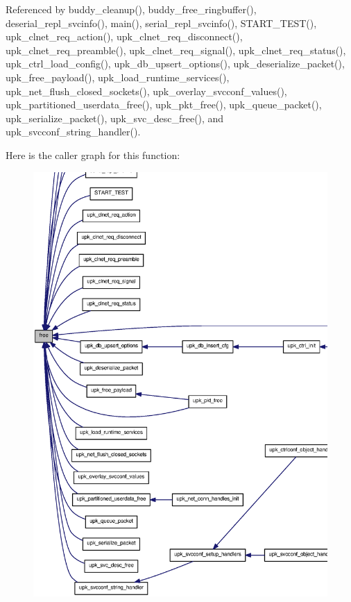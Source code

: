 Referenced by buddy\_\-cleanup(), buddy\_\-free\_\-ringbuffer(), deserial\_\-repl\_\-svcinfo(), main(), serial\_\-repl\_\-svcinfo(), START\_\-TEST(), upk\_\-clnet\_\-req\_\-action(), upk\_\-clnet\_\-req\_\-disconnect(), upk\_\-clnet\_\-req\_\-preamble(), upk\_\-clnet\_\-req\_\-signal(), upk\_\-clnet\_\-req\_\-status(), upk\_\-ctrl\_\-load\_\-config(), upk\_\-db\_\-upsert\_\-options(), upk\_\-deserialize\_\-packet(), upk\_\-free\_\-payload(), upk\_\-load\_\-runtime\_\-services(), upk\_\-net\_\-flush\_\-closed\_\-sockets(), upk\_\-overlay\_\-svcconf\_\-values(), upk\_\-partitioned\_\-userdata\_\-free(), upk\_\-pkt\_\-free(), upk\_\-queue\_\-packet(), upk\_\-serialize\_\-packet(), upk\_\-svc\_\-desc\_\-free(), and upk\_\-svcconf\_\-string\_\-handler().



Here is the caller graph for this function:
\nopagebreak
\begin{figure}[H]
\begin{center}
\leavevmode
\includegraphics[width=400pt]{controller_2tp_8c_a21d2fcdfab8b6e8986291507cd816eb4_icgraph}
\end{center}
\end{figure}



